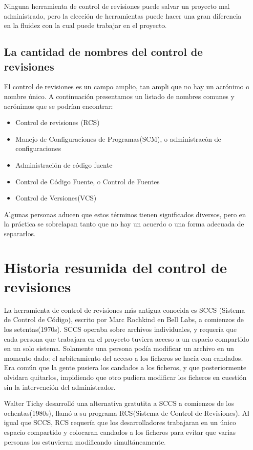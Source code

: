 Ninguna herramienta de control de revisiones puede salvar un
proyecto mal administrado, pero la elección de herramientas puede
hacer una gran diferencia en la fluidez con la cual puede trabajar en
el proyecto.

\subsection{La cantidad de nombres del control de revisiones}

El control de revisiones es un campo amplio, tan ampli que no hay un
acrónimo o nombre único. A continuación presentamos un listado de
nombres comunes y acrónimos que se podrían encontrar:
\begin{itemize}
\item Control de revisiones (RCS)
\item Manejo de Configuraciones de Programas(SCM), o administracón de
  configuraciones
\item Administración de código fuente
\item Control de Código Fuente, o Control de Fuentes
\item Control de Versiones(VCS)
\end{itemize}
Algunas personas aducen que estos términos tienen significados
diversos, pero en la práctica se sobrelapan tanto que no hay un
acuerdo o una forma adecuada de separarlos.

\section{Historia resumida del control de revisiones}

La herramienta de control de revisiones más antigua conocida es SCCS 
(Sistema de Control de Código), escrito por Marc Rochkind en Bell
Labs, a comienzos de los setentas(1970s).  SCCS operaba sobre archivos
individuales, y requería que cada persona que trabajara en el proyecto
tuviera acceso a un espacio compartido en un solo sistema.  Solamente
una persona podía modificar un archivo en un momento dado; el
arbitramiento del acceso a los ficheros se hacía con candados. Era
común que la gente pusiera los candados a los ficheros, y que
posteriormente olvidara quitarlos, impidiendo que otro pudiera
modificar los ficheros en cuestión sin la intervención del
administrador.

Walter Tichy desarrolló una alternativa gratutita a SCCS a comienzos
de los ochentas(1980s), llamó a su programa RCS(Sistema de Control de
Revisiones).  Al igual que SCCS, RCS requería que los desarrolladores
trabajaran en un único espacio compartido y colocaran candados a los
ficheros para evitar que varias personas los estuvieran modificando
simultáneamente.

